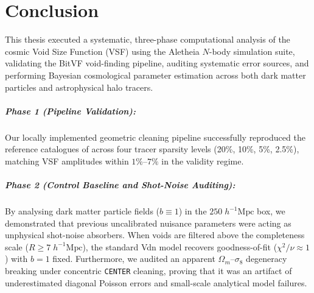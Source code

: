 \documentclass[12pt]{report}
\begin{document}
\chapter{Conclusion}
\label{chap:conclusion}

This thesis executed a systematic, three-phase computational analysis of the cosmic Void Size Function (VSF) using the Aletheia $N$-body simulation suite, validating the BitVF void-finding pipeline, auditing systematic error sources, and performing Bayesian cosmological parameter estimation across both dark matter particles and astrophysical halo tracers.

\paragraph{Phase 1 (Pipeline Validation):} Our locally implemented geometric cleaning pipeline successfully reproduced the reference catalogues of \citet{Sartori2025} across four tracer sparsity levels (20\%, 10\%, 5\%, 2.5\%), matching VSF amplitudes within $1\%$--$7\%$ in the validity regime.

\paragraph{Phase 2 (Control Baseline and Shot-Noise Auditing):} By analysing dark matter particle fields ($b \equiv 1$) in the $250\;h^{-1}\mathrm{Mpc}$ box, we demonstrated that previous uncalibrated nuisance parameters were acting as unphysical shot-noise absorbers. When voids are filtered above the completeness scale ($R \ge 7\;h^{-1}\mathrm{Mpc}$), the standard Vdn model recovers goodness-of-fit ($\chi^2/\nu \approx 1$) with $b=1$ fixed. Furthermore, we audited an apparent $\Omega_m$--$\sigma_8$ degeneracy breaking under concentric \texttt{CENTER} cleaning, proving that it was an artifact of underestimated diagonal Poisson errors and small-scale analytical model failures.
\end{document}
